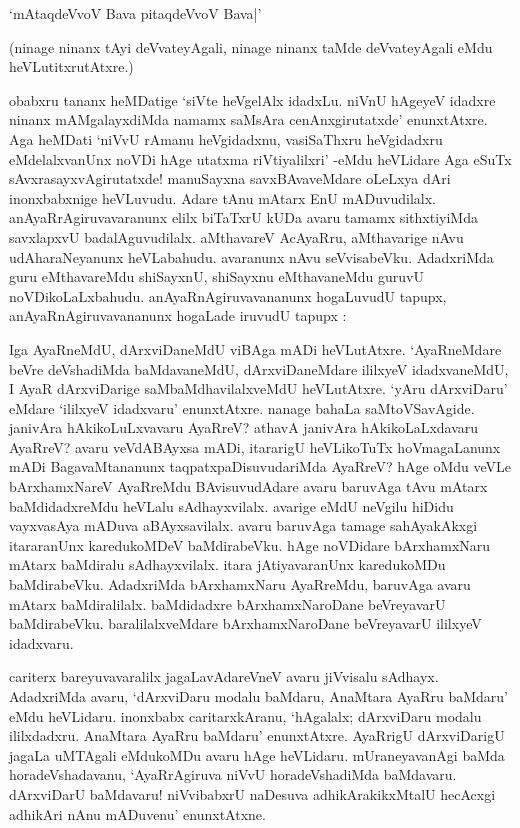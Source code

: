 \begin{shloka}
`mAtaqdeVvoV Bava pitaqdeVvoV Bava|'
\end{shloka}

(ninage ninanx tAyi deVvateyAgali, ninage ninanx taMde deVvateyAgali eMdu heVLutitxrutAtxre.)

obabxru tananx heMDatige `siVte heVgelAlx idadxLu. niVnU hAgeyeV idadxre ninanx mAMgalayxdiMda namamx saMsAra cenAnxgirutatxde' enunxtAtxre. Aga heMDati `niVvU rAmanu heVgidadxnu, vasiSaThxru heVgidadxru eMdelalxvanUnx noVDi hAge utatxma riVtiyalilxri' -eMdu heVLidare Aga eSuTx sAvxrasayxvAgirutatxde! manuSayxna savxBAvaveMdare oLeLxya dAri inonxbabxnige heVLuvudu. Adare tAnu mAtarx EnU mADuvudilalx. anAyaRrAgiruvavaranunx elilx biTaTxrU kUDa avaru tamamx sithxtiyiMda savxlapxvU badalAguvudilalx. aMthavareV AcAyaRru, aMthavarige nAvu udAharaNeyanunx heVLabahudu. avaranunx nAvu seVvisabeVku. AdadxriMda guru eMthavareMdu shiSayxnU, shiSayxnu eMthavaneMdu guruvU noVDikoLaLxbahudu. anAyaRnAgiruvavananunx hogaLuvudU tapupx, anAyaRnAgiruvavananunx hogaLade iruvudU tapupx :


Iga AyaRneMdU, dArxviDaneMdU viBAga mADi heVLutAtxre. `AyaRneMdare beVre deVshadiMda baMdavaneMdU, dArxviDaneMdare ililxyeV idadxvaneMdU, I AyaR dArxviDarige saMbaMdhavilalxveMdU heVLutAtxre. `yAru dArxviDaru' eMdare `ililxyeV idadxvaru' enunxtAtxre. nanage bahaLa saMtoVSavAgide. janivAra hAkikoLuLxvavaru AyaRreV? athavA janivAra hAkikoLaLxdavaru AyaRreV? avaru veVdABAyxsa mADi, itararigU heVLikoTuTx hoVmagaLanunx mADi BagavaMtananunx taqpatxpaDisuvudariMda AyaRreV? hAge oMdu veVLe bArxhamxNareV AyaRreMdu BAvisuvudAdare avaru baruvAga tAvu mAtarx baMdidadxreMdu heVLalu sAdhayxvilalx. avarige eMdU neVgilu hiDidu vayxvasAya mADuva aBAyxsavilalx. avaru baruvAga tamage sahAyakAkxgi itararanUnx karedukoMDeV baMdirabeVku. hAge noVDidare bArxhamxNaru mAtarx baMdiralu sAdhayxvilalx. itara jAtiyavaranUnx karedukoMDu baMdirabeVku. AdadxriMda bArxhamxNaru AyaRreMdu, baruvAga avaru mAtarx baMdiralilalx. baMdidadxre bArxhamxNaroDane beVreyavarU baMdirabeVku. baralilalxveMdare bArxhamxNaroDane beVreyavarU ililxyeV idadxvaru.

cariterx bareyuvavaralilx jagaLavAdareVneV avaru jiVvisalu sAdhayx. AdadxriMda avaru, `dArxviDaru modalu baMdaru, AnaMtara AyaRru baMdaru' eMdu heVLidaru. inonxbabx caritarxkAranu, `hAgalalx; dArxviDaru modalu ililxdadxru. AnaMtara AyaRru baMdaru' enunxtAtxre. AyaRrigU dArxviDarigU jagaLa uMTAgali eMdukoMDu avaru hAge heVLidaru. mUraneyavanAgi baMda horadeVshadavanu, `AyaRrAgiruva niVvU horadeVshadiMda baMdavaru. dArxviDarU baMdavaru! niVvibabxrU naDesuva adhikArakikxMtalU hecAcxgi adhikAri nAnu mADuvenu' enunxtAtxne.

